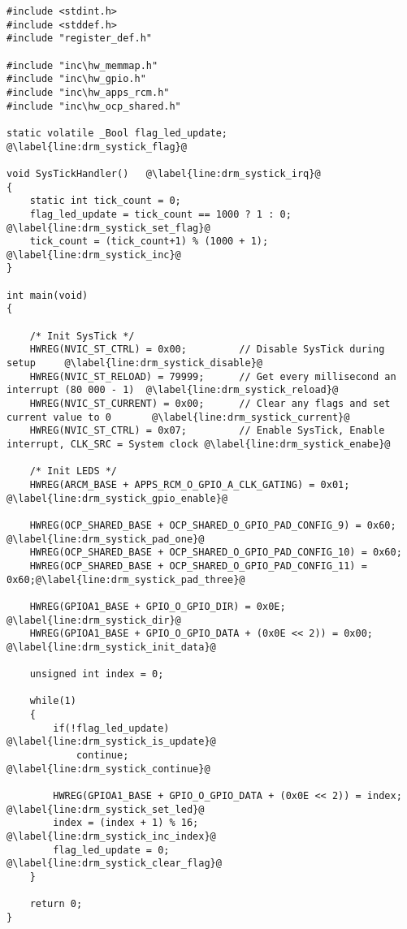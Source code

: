 \newpage
\begin{lstlisting}[style=CStyle, caption={Toggling LEDs according to Table \ref{tab:led_scheme} using DRM programming technique}, captionpos=b, label={lst:led_systick_drm}, escapechar=@]
#include <stdint.h>
#include <stddef.h>
#include "register_def.h"

#include "inc\hw_memmap.h"
#include "inc\hw_gpio.h"
#include "inc\hw_apps_rcm.h"
#include "inc\hw_ocp_shared.h"

static volatile _Bool flag_led_update;  @\label{line:drm_systick_flag}@

void SysTickHandler()   @\label{line:drm_systick_irq}@
{
    static int tick_count = 0;
    flag_led_update = tick_count == 1000 ? 1 : 0;   @\label{line:drm_systick_set_flag}@
    tick_count = (tick_count+1) % (1000 + 1);       @\label{line:drm_systick_inc}@
}

int main(void)
{

    /* Init SysTick */
    HWREG(NVIC_ST_CTRL) = 0x00;         // Disable SysTick during setup     @\label{line:drm_systick_disable}@
    HWREG(NVIC_ST_RELOAD) = 79999;      // Get every millisecond an interrupt (80 000 - 1)  @\label{line:drm_systick_reload}@
    HWREG(NVIC_ST_CURRENT) = 0x00;      // Clear any flags and set current value to 0       @\label{line:drm_systick_current}@
    HWREG(NVIC_ST_CTRL) = 0x07;         // Enable SysTick, Enable interrupt, CLK_SRC = System clock @\label{line:drm_systick_enabe}@

    /* Init LEDS */
    HWREG(ARCM_BASE + APPS_RCM_O_GPIO_A_CLK_GATING) = 0x01;     @\label{line:drm_systick_gpio_enable}@

    HWREG(OCP_SHARED_BASE + OCP_SHARED_O_GPIO_PAD_CONFIG_9) = 0x60; @\label{line:drm_systick_pad_one}@
    HWREG(OCP_SHARED_BASE + OCP_SHARED_O_GPIO_PAD_CONFIG_10) = 0x60;
    HWREG(OCP_SHARED_BASE + OCP_SHARED_O_GPIO_PAD_CONFIG_11) = 0x60;@\label{line:drm_systick_pad_three}@

    HWREG(GPIOA1_BASE + GPIO_O_GPIO_DIR) = 0x0E;            @\label{line:drm_systick_dir}@
    HWREG(GPIOA1_BASE + GPIO_O_GPIO_DATA + (0x0E << 2)) = 0x00; @\label{line:drm_systick_init_data}@

    unsigned int index = 0;

    while(1)
    {
        if(!flag_led_update)        @\label{line:drm_systick_is_update}@
            continue;               @\label{line:drm_systick_continue}@

        HWREG(GPIOA1_BASE + GPIO_O_GPIO_DATA + (0x0E << 2)) = index;    @\label{line:drm_systick_set_led}@
        index = (index + 1) % 16;                                       @\label{line:drm_systick_inc_index}@
        flag_led_update = 0;                                            @\label{line:drm_systick_clear_flag}@
    }

    return 0;
}
\end{lstlisting}


